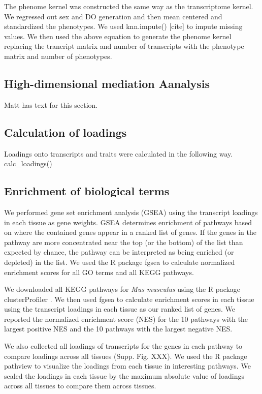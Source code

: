 \documentclass[
]{article}
\begin{document}
The phenome kernel was constructed the same way as the transcriptome
kernel. We regressed out sex and DO generation and then mean centered
and standardized the phenotypes. We used knn.impute() {[}cite{]} to
impute missing values. We then used the above equation to generate the
phenome kernel replacing the trancript matrix and number of transcripts
with the phenotype matrix and number of phenotypes.

\subsection{High-dimensional mediation
Aanalysis}\label{high-dimensional-mediation-aanalysis}

Matt has text for this section.

\subsection{Calculation of loadings}\label{calculation-of-loadings}

Loadings onto transcripts and traits were calculated in the following
way. calc\_loadings()

\subsection{Enrichment of biological
terms}\label{enrichment-of-biological-terms}

We performed gene set enrichment analysis (GSEA) \cite{pmid16199517}
using the transcript loadings in each tissue as gene weights. GSEA
determines enrichment of pathways based on where the contained genes
appear in a ranked list of genes. If the genes in the pathway are more
concentrated near the top (or the bottom) of the list than expected by
chance, the pathway can be interpreted as being enriched (or depleted)
in the list. We used the R package fgsea \cite{fgsea} to calculate
normalized enrichment scores for all GO terms and all KEGG pathways.

We downloaded all KEGG \cite{pmid36300620} pathways for
\textit{Mus musculus} using the R package clusterProfiler
\cite{pmid36300620}. We then used fgsea to calculate enrichment scores
in each tissue using the transcript loadings in each tissue as our
ranked list of genes. We reported the normalized enrichment score (NES)
for the 10 pathways with the largest positive NES and the 10 pathways
with the largest negative NES.

We also collected all loadings of transcripts for the genes in each
pathway to compare loadings across all tissues (Supp. Fig. XXX). We used
the R package pathview \cite{pmid23740750} to visualize the loadings
from each tissue in interesting pathways. We scaled the loadings in each
tissue by the maximum absolute value of loadings across all tissues to
compare them across tissues.
\end{document}

